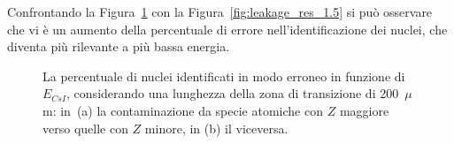Confrontando la Figura~\ref{fig:leakage_res_substrate} con la Figura~\ref{fig:leakage_res_1.5} si può osservare che vi è un aumento della percentuale di errore nell'identificazione dei nuclei, che diventa più rilevante a più bassa energia.



\begin{figure}[!p] 
	\centering
	\hspace{10mm}
	\caption{La percentuale di nuclei identificati in modo erroneo in funzione di $E_{CsI}$, considerando una lunghezza della zona di transizione di 200~$\mu$m: in~(a) la contaminazione da specie atomiche con $Z$ maggiore verso quelle con $Z$ minore, in (b) il viceversa.} \label{fig:leakage_res_substrate}
\end{figure}



